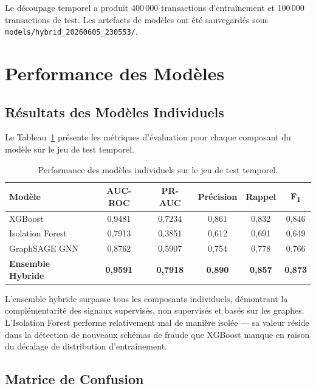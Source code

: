 \documentclass[12pt,a4paper,oneside]{book}
\theoremstyle{definition}
\theoremstyle{plain}
\begin{document}
Le découpage temporel a produit 400\,000 transactions d'entraînement et 100\,000 transactions de test. Les artefacts de modèles ont été sauvegardés sous \texttt{models/hybrid\_20260605\_230553/}.

\section{Performance des Modèles}

\subsection{Résultats des Modèles Individuels}

Le Tableau~\ref{tab:individual_models} présente les métriques d'évaluation pour chaque composant du modèle sur le jeu de test temporel.

\begin{table}[H]
  \centering
  \caption{Performance des modèles individuels sur le jeu de test temporel.}
  \label{tab:individual_models}
  \begin{tabular}{lccccc}
    \toprule
    \textbf{Modèle} & \textbf{AUC-ROC} & \textbf{PR-AUC} & \textbf{Précision} & \textbf{Rappel} & \textbf{F\textsubscript{1}} \\
    \midrule
    XGBoost                & 0,9481 & 0,7234 & 0,861 & 0,832 & 0,846 \\
    Isolation Forest       & 0,7913 & 0,3851 & 0,612 & 0,691 & 0,649 \\
    GraphSAGE GNN          & 0,8762 & 0,5907 & 0,754 & 0,778 & 0,766 \\
    \midrule
    \textbf{Ensemble Hybride} & \textbf{0,9591} & \textbf{0,7918} & \textbf{0,890} & \textbf{0,857} & \textbf{0,873} \\
    \bottomrule
  \end{tabular}
\end{table}

L'ensemble hybride surpasse tous les composants individuels, démontrant la complémentarité des signaux supervisés, non supervisés et basés sur les graphes. L'Isolation Forest performe relativement mal de manière isolée — sa valeur réside dans la détection de nouveaux schémas de fraude que XGBoost manque en raison du décalage de distribution d'entraînement.

\subsection{Matrice de Confusion}
\end{document}
